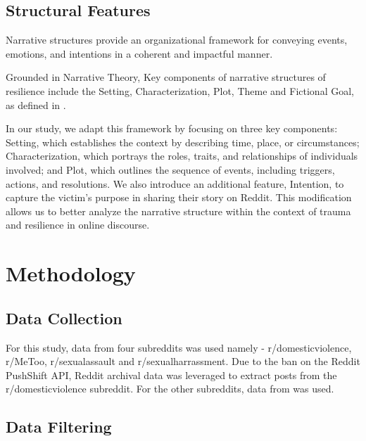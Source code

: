 \documentclass[11pt]{article}
\begin{document}
\subsection{Structural Features}

Narrative structures provide an organizational framework for conveying events, emotions, and intentions in a coherent and impactful manner. 

Grounded in Narrative Theory, Key components of narrative structures of resilience include the Setting, Characterization, Plot, Theme and Fictional Goal, as defined in \citep{neimeyer2001coping}.  

In our study, we adapt this framework by focusing on three key components: 
Setting, which establishes the context by describing time, place, or circumstances; 
Characterization, which portrays the roles, traits, and relationships of individuals involved;
and Plot, which outlines the sequence of events, including triggers, actions, and resolutions. 
We also introduce an additional feature, Intention, to capture the victim’s purpose in sharing their story on Reddit. 
This modification allows us to better analyze the narrative structure within the context of trauma and resilience in online discourse.

\section{Methodology}

\subsection{Data Collection}

For this study, data from four subreddits was used namely - r/domesticviolence, r/MeToo, r/sexualassault and r/sexualharrassment. Due to the ban on the Reddit PushShift API, Reddit archival data was leveraged to extract posts from the r/domesticviolence subreddit. 
For the other subreddits, data from \citep{garg2024unveiling} was used. 

\subsection{Data Filtering}
\end{document}
